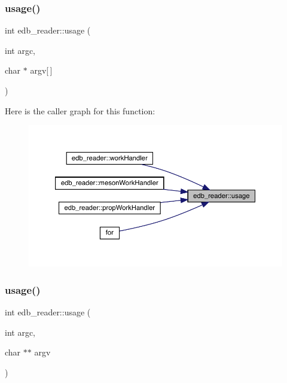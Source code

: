 \subsubsection{\texorpdfstring{usage()}{usage()}\hspace{0.1cm}{\footnotesize\ttfamily [1/2]}}
{\footnotesize\ttfamily int edb\+\_\+reader\+::usage (\begin{DoxyParamCaption}\item[{int}]{argc,  }\item[{char $\ast$}]{argv\mbox{[}$\,$\mbox{]} }\end{DoxyParamCaption})}

Here is the caller graph for this function\+:
\nopagebreak
\begin{figure}[H]
\begin{center}
\leavevmode
\includegraphics[width=350pt]{d8/d4f/namespaceedb__reader_a813c5a58e50141034390e821ed895942_icgraph}
\end{center}
\end{figure}
\mbox{\label{namespaceedb__reader_a39298f59ee1c604a3c52311afab377e5}} 
\subsubsection{\texorpdfstring{usage()}{usage()}\hspace{0.1cm}{\footnotesize\ttfamily [2/2]}}
{\footnotesize\ttfamily int edb\+\_\+reader\+::usage (\begin{DoxyParamCaption}\item[{int}]{argc,  }\item[{char $\ast$$\ast$}]{argv }\end{DoxyParamCaption})}


